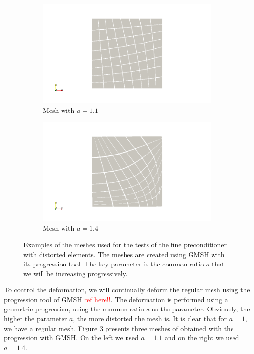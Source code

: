 \begin{figure}
\centering
\begin{subfigure}{.5\textwidth}
  \centering
  \includegraphics[width=1.2\linewidth]{Results/fine_mesh_deform_1.png}
  \caption{Mesh with $a=1.1$}
  \label{fine_mesh_deform_1}
\end{subfigure}%
\begin{subfigure}{.5\textwidth}
  \centering
  \includegraphics[width=1.2\linewidth]{Results/fine_mesh_deform_2.png}
  \caption{Mesh with $a=1.4$}
  \label{fine_mesh_deform_2}
\end{subfigure}
\caption{Examples of the meshes used for the tests of the fine preconditioner with distorted elements. The meshes are created using GMSH with its progression tool. The key parameter is the common ratio $a$ that we will be increasing progressively.}
\label{fine_mesh_deform}
\end{figure}

To control the deformation, we will continually deform the regular mesh using the progression tool of GMSH \textcolor{red}{ref here!!}. The deformation is performed using a geometric progression, using the common ratio $a$ as the parameter. Obviously, the higher the parameter $a$, the more distorted the mesh is. It is clear that for $a=1$, we have a regular mesh. Figure \ref{fine_mesh_deform} presents three meshes of obtained with the progression with GMSH. On the left we used $a = 1.1$ and on the right we used $a=1.4$. 

